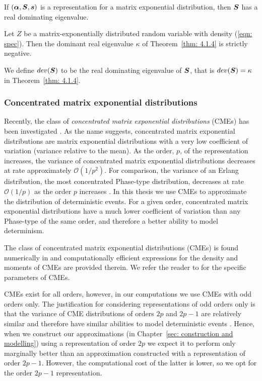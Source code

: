 \begin{cor}
If \((\boldsymbol \alpha, \boldsymbol S, \boldsymbol s)\) is a representation for a matrix exponential distribution, then \(\boldsymbol S\) has a real dominating eigenvalue.
\end{cor}
\begin{thm}
	Let \(Z\) be a matrix-exponentially distributed random variable with density (\ref{eqn: spec}). Then the dominant real eigenvalue \(\kappa\) of Theorem~\ref{thm: 4.1.4} is strictly negative. 
\end{thm}
We define \(dev(\boldsymbol S)\) to be the real dominating eigenvalue of \(\boldsymbol S\), that is \(dev(\boldsymbol S)=\kappa\) in Theorem~\ref{thm: 4.1.4}.

\subsubsection*{Concentrated matrix exponential distributions}
Recently, the class of \emph{concentrated matrix exponential distributions} (CMEs) has been investigated \citep{ert2006,hstz2016,ert2006,hht2020,mt2021}. As the name suggests, concentrated matrix exponential distributions are matrix exponential distributions with a very low coefficient of variation (variance relative to the mean). As the order, \(p\), of the representation increases, the variance of concentrated matrix exponential distributions decreases at rate approximately \(\mathcal O(1/p^2)\). For comparison, the variance of an Erlang distribution, the most concentrated Phase-type distribution, decreases at rate \(\mathcal O(1/p)\) as the order \(p\) increases \citep{as1987}. In this thesis we use CMEs to approximate the distribution of deterministic events. For a given order, concentrated matrix exponential distributions have a much lower coefficient of variation than any Phase-type of the same order, and therefore a better ability to model determinism. 

The class of concentrated matrix exponential distributions (CMEs) is found numerically in \citep{hht2020} and computationally efficient expressions for the density and moments of CMEs are provided therein. We refer the reader to \citep{hht2020} for the specific parameters of CMEs. 

CMEs exist for all orders, however, in our computations we use CMEs with odd orders only. The justification for considering representations of odd orders only is that the variance of CME distributions of orders \(2p\) and \(2p-1\) are relatively similar and therefore have similar abilities to model deterministic events \citep{hht2020}. Hence, when we construct our approximations (in Chapter~\ref{sec: construction and modelling}) using a representation of order \(2p\) we expect it to perform only marginally better than an approximation constructed with a representation of order \(2p-1\). However, the computational cost of the latter is lower, so we opt for the order \(2p-1\) representation. 

